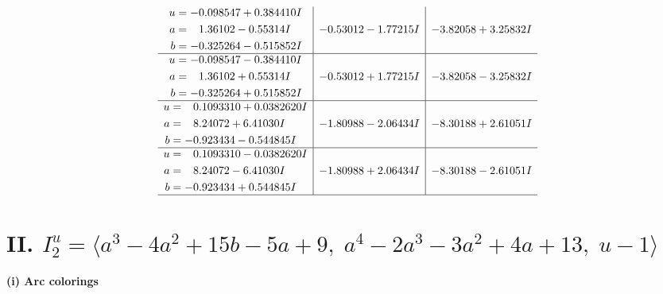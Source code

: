 \documentclass[1p]{elsarticle_modified}
\theoremstyle{definition}
\begin{document}
$$\begin{array}{c|c|c}
\begin{aligned}
u &= -0.098547 + 0.384410 I \\
a &= \phantom{-}1.36102 - 0.55314 I \\
b &= -0.325264 - 0.515852 I\end{aligned}
 & -0.53012 - 1.77215 I & -3.82058 + 3.25832 I \\ \hline\begin{aligned}
u &= -0.098547 - 0.384410 I \\
a &= \phantom{-}1.36102 + 0.55314 I \\
b &= -0.325264 + 0.515852 I\end{aligned}
 & -0.53012 + 1.77215 I & -3.82058 - 3.25832 I \\ \hline\begin{aligned}
u &= \phantom{-}0.1093310 + 0.0382620 I \\
a &= \phantom{-}8.24072 + 6.41030 I \\
b &= -0.923434 - 0.544845 I\end{aligned}
 & -1.80988 - 2.06434 I & -8.30188 + 2.61051 I \\ \hline\begin{aligned}
u &= \phantom{-}0.1093310 - 0.0382620 I \\
a &= \phantom{-}8.24072 - 6.41030 I \\
b &= -0.923434 + 0.544845 I\end{aligned}
 & -1.80988 + 2.06434 I & -8.30188 - 2.61051 I\\
 \hline 
 \end{array}$$\newpage\newpage\renewcommand{\arraystretch}{1}
\centering \section*{II. $I^u_{2}= \langle a^3-4 a^2+15 b-5 a+9,\;a^4-2 a^3-3 a^2+4 a+13,\;u-1 \rangle$}
\flushleft \textbf{(i) Arc colorings}\\
\end{document}
